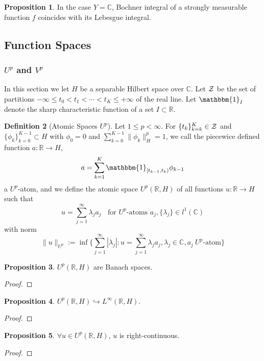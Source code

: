 \documentclass{article}
\theoremstyle{definition}
\newtheorem{definition}{Definition}[subsection]
\newtheorem{proposition}[definition]{Proposition}
\theoremstyle{remark}
\begin{document}
\begin{proposition}
In the case $Y=\mathbb{C}$, Bochner integral of a strongly measurable function $f$ coincides with its Lebesgue integral. 
\end{proposition}

\subsection{Function Spaces}
\subsubsection{$U^p$ and $V^p$}
In this section we let $H$ be a separable Hilbert space over $\mathbb{C}$. Let ${\cal Z}$ be the set of partitions $-\infty\le t_0<t_1<\cdots<t_K\le+\infty$ of the real line. Let $\mathbbm{1}_I$ denote the sharp characteristic function of a set $I\subset\mathbb{R}$. 

\begin{definition}[Atomic Spaces $U^p$]
Let $1\le p<\infty$. For $\{t_k\}_{k=k}^K\in{\cal Z}$ and $\{\phi_k\}_{k=0}^{K-1}\subset H$ with $\phi_0=0$ and $\sum_{k=0}^{K-1}\|\phi_k\|_H^p=1$, we call the piecewice defined function $a:\mathbb{R}\rightarrow H$, 
$$a=\sum_{k=1}^K\mathbbm{1}_{[t_{k-1},t_k)}\phi_{k-1}$$
a $U^p$-atom, and we define the atomic space $U^p(\mathbb{R},H)$ of all functions $u:\mathbb{R}\rightarrow H$ such that 
$$u=\sum_{j=1}^\infty\lambda_ja_j\ \ \ \ \text{for }U^p\text{-atoms }a_j,\{\lambda_j\}\in l^1(\mathbb{C})$$
with norm 
$$\|u\|_{U^p}:=\inf\{\sum_{j=1}^\infty|\lambda_j|:u=\sum_{j=1}^\infty\lambda_ja_j,\lambda_j\in\mathbb{C},a_j\ U^p\text{-atom}\}$$
\end{definition}

\begin{proposition}
$U^p(\mathbb{R},H)$ are Banach spaces. 
\end{proposition}
\begin{proof}

\end{proof}

\begin{proposition}
$U^p(\mathbb{R},H)\hookrightarrow L^\infty(\mathbb{R},H)$. 
\end{proposition}
\begin{proof}

\end{proof}

\begin{proposition}
$\forall u\in U^p(\mathbb{R},H)$, $u$ is right-continuous. 
\end{proposition}
\begin{proof}

\end{proof}
\end{document}
